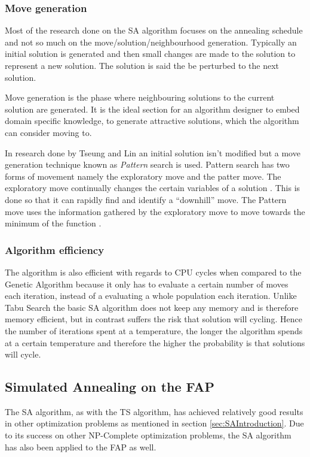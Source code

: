 \subsubsection{Move generation}
Most of the research done on the SA algorithm focuses on the annealing schedule and not so much on the move/solution/neighbourhood generation. Typically an initial solution is generated and then small changes are made to the solution to represent a new solution. The solution is said the be perturbed to the next solution.

Move generation is the phase where neighbouring solutions to the current solution are generated. It is the ideal section for an algorithm designer to embed domain specific knowledge, to generate attractive solutions, which the algorithm can consider moving to.

In research done by Tseung and Lin \cite{CurveFittingSA} an initial solution isn't modified but a move generation technique known as \emph{Pattern} search is used. Pattern search has two forms of movement namely the exploratory move and the patter move. The exploratory move continually changes the certain variables of a solution \cite{CurveFittingSA}. This is done so that it can rapidly find and identify a ``downhill'' move. The Pattern move uses the information gathered by the exploratory move to move towards the minimum of the function \cite{CurveFittingSA}.
\subsubsection{Algorithm efficiency}
The algorithm is also efficient with regards to CPU cycles when compared to the Genetic Algorithm because it only has to evaluate a certain number of moves each iteration, instead of a evaluating a whole population each iteration. Unlike Tabu Search the basic SA algorithm does not keep any memory and is therefore memory efficient, but in contrast suffers the risk that solution will cycling. Hence the number of iterations spent at a temperature, the longer the algorithm spends at a certain temperature and therefore the higher the probability is that solutions will cycle.
\subsection{Simulated Annealing on the FAP}
The SA algorithm, as with the TS algorithm, has achieved relatively good results in other optimization problems as mentioned in section \ref{sec:SAIntroduction}. Due to its success on other NP-Complete optimization problems, the SA algorithm has also been applied to the FAP as well.

